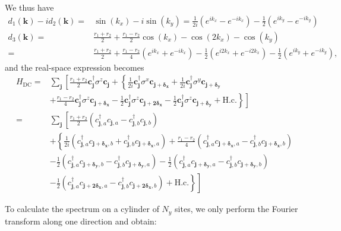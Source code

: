 \documentclass[english]{scrartcl}
\begin{document}
We thus have 
\begin{align*}
d_1(\bm k) - i d_2(\bm k) =& \sin(k_x) - i\sin(k_y) = \frac{1}{2i} \left(e^{ik_x} - e^{-ik_x}\right) - \frac{1}{2} \left(e^{ik_y} - e^{-ik_y}\right)\\
d_3(\bm k) =& \frac{r_1 + r_2}{2} + \frac{r_1 - r_2}{2} \cos(k_x) - \cos(2 k_x)  - \cos(k_y) \\
=& \frac{r_1 + r_2}{2} + \frac{r_1 - r_2}{4} \left(e^{ik_x} + e^{-ik_x}\right) - \frac{1}{2} \left(e^{i2k_x} + e^{-i2k_x}\right)  - \frac{1}{2} \left(e^{ik_y} + e^{-ik_y}\right),
\end{align*}
and the real-space expression becomes
\begin{align*}
H_{\text{DC}} = & \sum_{\bm j} \left [\frac{r_1 + r_2}{2} \bm c_{\bm{j}}^\dagger \sigma^z \bm c_{\bm{j}} + \left \{\frac{1}{2i} \bm c_{\bm{j}}^\dagger \sigma^x \bm c_{\bm{j + \delta_x}} + \frac{1}{2i} \bm c_{\bm{j}}^\dagger \sigma^y \bm c_{\bm{j + \delta_y}}  \right. \right. \\
&\left. \left. + \frac{r_1 - r_2}{4} \bm c_{\bm{j}}^\dagger \sigma^z \bm c_{\bm{j  + \delta_x}} - \frac{1}{2} \bm c_{\bm{j}}^\dagger \sigma^z \bm c_{\bm{j  + 2 \delta_x}} - \frac{1}{2} \bm c_{\bm{j}}^\dagger \sigma^z \bm c_{\bm{j  + \delta_y}} + \text{H.c.}\right\} \right ] \\
=& \sum_{\bm j} \left [\frac{r_1 + r_2}{2} (c_{\bm{j}, a}^\dagger c_{\bm{j}, a} - c_{\bm{j},b}^\dagger c_{\bm{j}, b}) \right. \\ 
& + \left \{  \frac{1}{2i} (c_{\bm{j}, a}^\dagger c_{\bm{j + \delta_x}, b} + c_{\bm{j},b}^\dagger c_{\bm{j+ \delta_x}, a}) + \frac{r_1 - r_2}{4}  (c_{\bm{j}, a}^\dagger c_{\bm{j + \delta_x}, a} - c_{\bm{j},b}^\dagger c_{\bm{j+ \delta_x}, b})  \right. \\
&- \frac{1}{2} (c_{\bm{j}, a}^\dagger c_{\bm{j + \delta_y}, b} - c_{\bm{j},b}^\dagger c_{\bm{j+ \delta_y}, a})  - \frac{1}{2}  (c_{\bm{j}, a}^\dagger c_{\bm{j + \delta_y}, a} - c_{\bm{j},b}^\dagger c_{\bm{j+ \delta_y}, b})  \\
&\left. \left. - \frac{1}{2}  (c_{\bm{j}, a}^\dagger c_{\bm{j + 2 \delta_x}, a} - c_{\bm{j},b}^\dagger c_{\bm{j + 2 \delta_x}, b}) + \text{H.c.} \right \} \right]
\end{align*}


To calculate the spectrum on a cylinder of $N_y$ sites, we only perform the Fourier transform along one direction and obtain:
\end{document}
